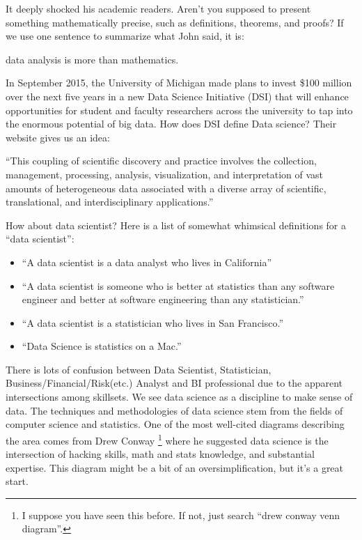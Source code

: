 \documentclass[12pt,]{krantz}
\providecommand{\tightlist}{%
  \setlength{\itemsep}{0pt}\setlength{\parskip}{0pt}}
\renewenvironment{quote}{\begin{VF}}{\end{VF}}
\theoremstyle{definition}
\theoremstyle{definition}
\theoremstyle{definition}
\theoremstyle{remark}
\begin{document}
It deeply shocked his academic readers. Aren't you supposed to present
something mathematically precise, such as definitions, theorems, and
proofs? If we use one sentence to summarize what John said, it is:

\begin{quote}
data analysis is more than mathematics.
\end{quote}

In September 2015, the University of Michigan made plans to invest \$100
million over the next five years in a new Data Science Initiative (DSI)
that will enhance opportunities for student and faculty researchers
across the university to tap into the enormous potential of big data.
How does DSI define Data science? Their website gives us an idea:

\begin{quote}
``This coupling of scientific discovery and practice involves the
collection, management, processing, analysis, visualization, and
interpretation of vast amounts of heterogeneous data associated with a
diverse array of scientific, translational, and interdisciplinary
applications.''
\end{quote}

How about data scientist? Here is a list of somewhat whimsical
definitions for a ``data scientist'':

\begin{itemize}
\tightlist
\item
  ``A data scientist is a data analyst who lives in California''
\item
  ``A data scientist is someone who is better at statistics than any
  software engineer and better at software engineering than any
  statistician.''
\item
  ``A data scientist is a statistician who lives in San Francisco.''
\item
  ``Data Science is statistics on a Mac.''
\end{itemize}

There is lots of confusion between Data Scientist, Statistician,
Business/Financial/Risk(etc.) Analyst and BI professional due to the
apparent intersections among skillsets. We see data science as a
discipline to make sense of data. The techniques and methodologies of
data science stem from the fields of computer science and statistics.
One of the most well-cited diagrams describing the area comes from Drew
Conway \footnote{I suppose you have seen this before. If not, just
  search ``drew conway venn diagram''.} where he suggested data science
is the intersection of hacking skills, math and stats knowledge, and
substantial expertise. This diagram might be a bit of an
oversimplification, but it's a great start.
\end{document}
